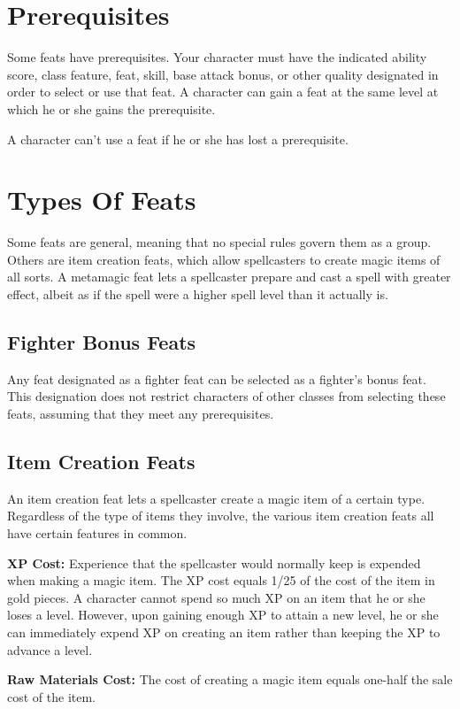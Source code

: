 \section{Prerequisites}
Some feats have prerequisites. Your character must have the indicated ability score, class feature, feat, skill, base attack bonus, or other quality designated in order to select or use that feat. A character can gain a feat at the same level at which he or she gains the prerequisite.

A character can’t use a feat if he or she has lost a prerequisite.

\section{Types Of Feats}
Some feats are general, meaning that no special rules govern them as a group. Others are item creation feats, which allow spellcasters to create magic items of all sorts. A metamagic feat lets a spellcaster prepare and cast a spell with greater effect, albeit as if the spell were a higher spell level than it actually is.

\subsection{Fighter Bonus Feats}
Any feat designated as a fighter feat can be selected as a fighter’s bonus feat. This designation does not restrict characters of other classes from selecting these feats, assuming that they meet any prerequisites.

\subsection{Item Creation Feats}
An item creation feat lets a spellcaster create a magic item of a certain type. Regardless of the type of items they involve, the various item creation feats all have certain features in common.

\textbf{XP Cost:} Experience that the spellcaster would normally keep is expended when making a magic item. The XP cost equals 1/25 of the cost of the item in gold pieces. A character cannot spend so much XP on an item that he or she loses a level. However, upon gaining enough XP to attain a new level, he or she can immediately expend XP on creating an item rather than keeping the XP to advance a level.

\textbf{Raw Materials Cost:} The cost of creating a magic item equals one-half the sale cost of the item.

